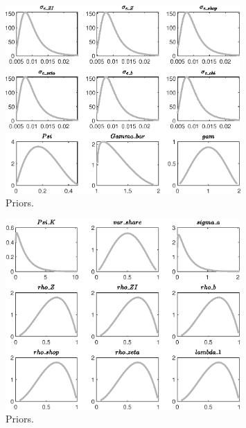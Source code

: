  
\begin{figure}[H]
\centering
\includegraphics[width=0.80\textwidth]{directed_search/graphs/directed_search_Priors1}
\caption{Priors.}\label{Fig:Priors:1}
\end{figure}
\begin{figure}[H]
\centering
\includegraphics[width=0.80\textwidth]{directed_search/graphs/directed_search_Priors2}
\caption{Priors.}\label{Fig:Priors:2}
\end{figure}
 
